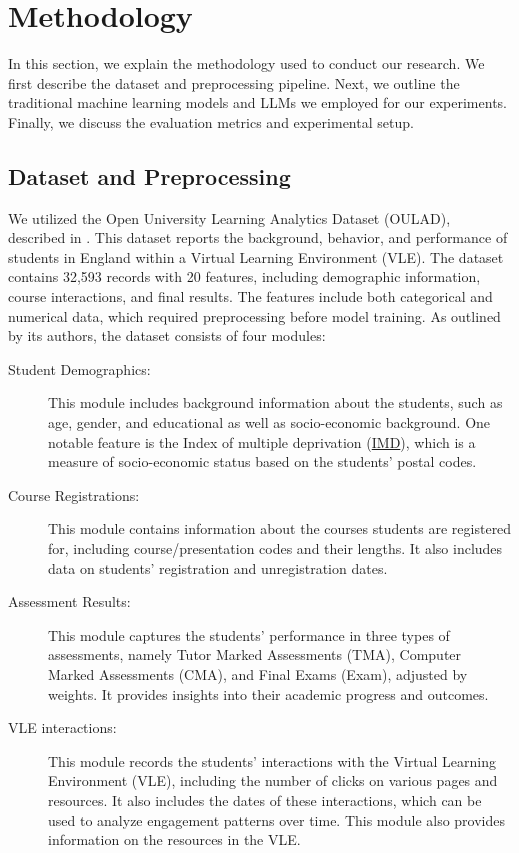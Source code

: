 \section{Methodology}

In this section, we explain the methodology used to conduct our research. We first describe the dataset and preprocessing pipeline. Next, we outline the traditional machine learning models and LLMs we employed for our experiments. Finally, we discuss the evaluation metrics and experimental setup.

\subsection{Dataset and Preprocessing}

We utilized the Open University Learning Analytics Dataset (OULAD), described in \cite{Kuzilek2017}. This dataset reports the background, behavior, and performance of students in England within a Virtual Learning Environment (VLE). The dataset contains 32,593 records with 20 features, including demographic information, course interactions, and final results. The features include both categorical and numerical data, which required preprocessing before model training. As outlined by its authors, the dataset consists of four modules:

\begin{description}
    \item[Student Demographics:] This module includes background information about the students, such as age, gender, and educational as well as socio-economic background. One notable feature is the Index of multiple deprivation (\href{https://www.gov.uk/government/statistics/english-indices-of-deprivation-2025/english-indices-of-deprivation-2025-statistical-release}{IMD}), which is a measure of socio-economic status based on the students' postal codes.
    \item[Course Registrations:] This module contains information about the courses students are registered for, including course/presentation codes and their lengths. It also includes data on students' registration and unregistration dates.
    \item[Assessment Results:] This module captures the students' performance in three types of assessments, namely Tutor Marked Assessments (TMA), Computer Marked Assessments (CMA), and Final Exams (Exam), adjusted by weights. It provides insights into their academic progress and outcomes.
    \item[VLE interactions:] This module records the students' interactions with the Virtual Learning Environment (VLE), including the number of clicks on various pages and resources. It also includes the dates of these interactions, which can be used to analyze engagement patterns over time. This module also provides information on the resources in the VLE.
\end{description}

